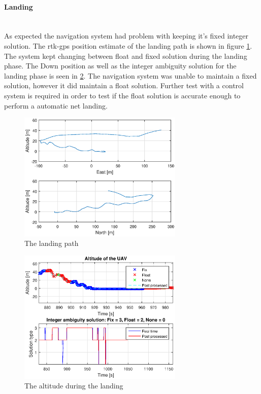 \paragraph{Landing}~\\
As expected the navigation system had problem with keeping it's fixed integer solution. The \gls{rtk-gps} position estimate of the landing path is shown in figure \ref{figure:landingPath}. The system kept changing between float and fixed solution during the landing phase. The Down position as well as the integer ambiguity solution for the landing phase is seen in \ref{figure:landingDownFlight}. The navigation system was unable to maintain a fixed solution, however it did maintain a float solution. Further test with a control system is required in order to test if the float solution is accurate enough to perform a automatic net landing.
\begin{figure}[H]
	\centering
		\includegraphics[width=0.7\textwidth]{figs/plots/landingPath.eps}
		\caption{The landing path}
		\label{figure:landingPath}
\end{figure}
\begin{figure}[H]
	\centering
		\includegraphics[width=0.7\textwidth]{figs/plots/landingDownFlight.eps}
		\caption{The altitude during the landing}
		\label{figure:landingDownFlight}
\end{figure}

